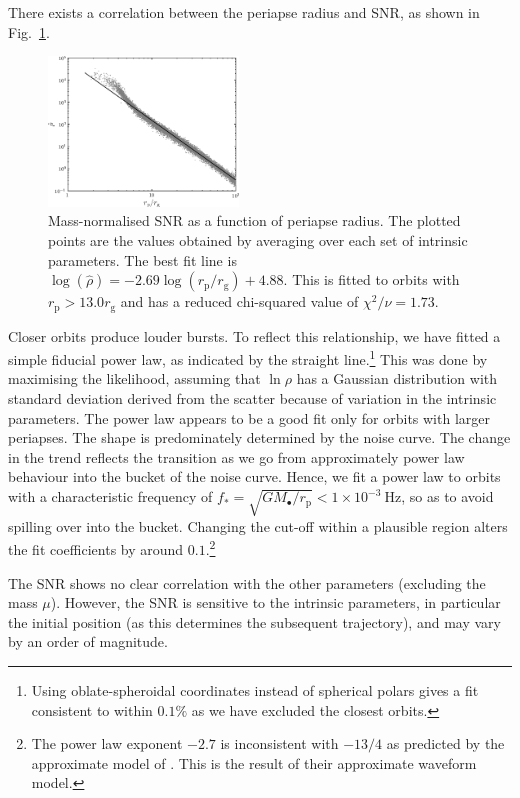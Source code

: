 \documentclass[useAMS,usedcolumn,usegraphicx,usenatbib]{mn2e}
\newcommand{\figref}[1]{Fig.~\ref{fig:#1}}
\newcommand{\units}[1]{\ensuremath{~\mathrm{#1}}}
\newcommand{\sub}[1]{\ensuremath{_\mathrm{#1}}}
\begin{document}
There exists a correlation between the periapse radius and SNR, as shown in \figref{SNR}.
\begin{figure}
  \begin{center}
  \includegraphics[width=0.45\textwidth]{Fig_SNR}
    \caption{Mass-normalised SNR as a function of periapse radius. The plotted points are the values obtained by averaging over each set of intrinsic parameters. The best fit line is $\log(\hat{\rho}) = -2.69\log(r\sub{p}/r\sub{g}) + 4.88$. This is fitted to orbits with $r\sub{p} >  13.0 r\sub{g}$ and has a reduced chi-squared value of $\chi^2/\nu = 1.73$.\label{fig:SNR}}
      \end{center}
\end{figure}
Closer orbits produce louder bursts. To reflect this relationship, we have fitted a simple fiducial power law, as indicated by the straight line.\footnote{Using oblate-spheroidal coordinates instead of spherical polars gives a fit consistent to within $0.1\%$ as we have excluded the closest orbits.} This was done by maximising the likelihood, assuming that $\ln \rho$ has a Gaussian distribution with standard deviation derived from the scatter because of variation in the intrinsic parameters. The power law appears to be a good fit only for orbits with larger periapses. The shape is predominately determined by the noise curve. The change in the trend reflects the transition as we go from approximately power law behaviour into the bucket of the noise curve. Hence, we fit a power law to orbits with a characteristic frequency of $f_\ast = \sqrt{GM_\bullet/r\sub{p}} < 1 \times 10^{-3}\units{Hz}$, so as to avoid spilling over into the bucket. Changing the cut-off within a plausible region alters the fit coefficients by around $0.1$.\footnote{The power law exponent $-2.7$ is inconsistent with $-13/4$ as predicted by the approximate model of \citet{Hopman2007}. This is the result of their approximate waveform model.}

The SNR shows no clear correlation with the other parameters (excluding the mass $\mu$). However, the SNR is sensitive to the intrinsic parameters, in particular the initial position (as this determines the subsequent trajectory), and may vary by an order of magnitude.
\end{document}

